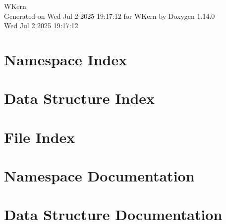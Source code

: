 \documentclass[twoside]{book}
\newcommand{\+}{\discretionary{\mbox{\scriptsize$\hookleftarrow$}}{}{}}
\newcommand{\clearemptydoublepage}{%
    \newpage{\pagestyle{empty}\cleardoublepage}%
  }
\begin{document}
  \raggedbottom
    \hypersetup{pageanchor=false,
                bookmarksnumbered=true,
                pdfencoding=unicode
               }
  \begin{titlepage}
  \vspace*{7cm}
  \begin{center}%
  {\Large WKern}\\
  \vspace*{1cm}
  {\large Generated on Wed Jul 2 2025 19\+:17\+:12 for WKern by Doxygen 1.14.0}\\
    \vspace*{0.5cm}
    {\small Wed Jul 2 2025 19:17:12}
  \end{center}
  \end{titlepage}
  \clearemptydoublepage
  \tableofcontents
  \clearemptydoublepage
  \hypersetup{pageanchor=true}

\chapter{Namespace Index}

\chapter{Data Structure Index}

\chapter{File Index}

\chapter{Namespace Documentation}







\chapter{Data Structure Documentation}














\end{document}
